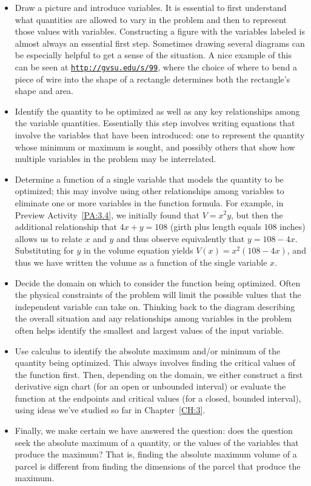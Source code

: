 \begin{itemize}
	\item Draw a picture and introduce variables.  It is essential to first understand what quantities are allowed to vary in the problem and then to represent those values with variables.  Constructing a figure with the variables labeled is almost always an essential first step.  Sometimes drawing several diagrams can be especially helpful to get a sense of the situation.  A nice example of this can be seen at \href{http://gvsu.edu/s/99}{\texttt{http://gvsu.edu/s/99}}, where the choice of where to bend a piece of wire into the shape of a rectangle determines both the rectangle's shape and area.
	\item Identify the quantity to be optimized as well as any key relationships among the variable quantities.  Essentially this step involves writing equations that involve the variables that have been introduced: one to represent the quantity whose minimum or maximum is sought, and possibly others that show how multiple variables in the problem may be interrelated.
	\item Determine a function of a single variable that models the quantity to be optimized; this may involve using other relationships among variables to eliminate one or more variables in the function formula.  For example, in Preview Activity~\ref{PA:3.4}, we initially found that $V = x^2 y$, but then the additional relationship that $4x + y = 108$ (girth plus length equals $108$ inches) allows us to relate $x$ and $y$ and thus observe equivalently that $y = 108-4x$.  Substituting for $y$ in the volume equation yields $V(x) = x^2(108-4x)$, and thus we have written the volume as a function of the single variable $x$.
	\item Decide the domain on which to consider the function being optimized.  Often the physical constraints of the problem will limit the possible values that the independent variable can take on.  Thinking back to the diagram describing the overall situation and any relationships among variables in the problem often helps identify the smallest and largest values of the input variable.
	\item Use calculus to identify the absolute maximum and/or minimum of the quantity being optimized.  This always involves finding the critical values of the function first.  Then, depending on the domain, we either construct a first derivative sign chart (for an open or unbounded interval) or evaluate the function at the endpoints and critical values (for a closed, bounded interval), using ideas we've studied so far in Chapter~\ref{CH:3}.
	\item Finally, we make certain we have answered the question:  does the question seek the absolute maximum of a quantity, or the values of the variables that produce the maximum?  That is, finding the absolute maximum volume of a parcel is different from finding the dimensions of the parcel that produce the maximum.
\end{itemize}

